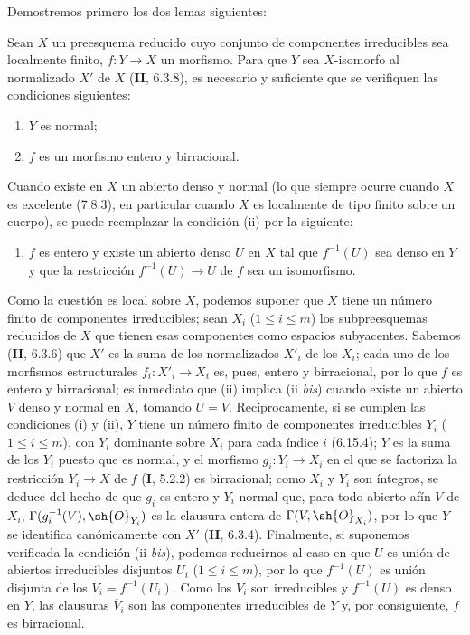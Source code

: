 Demostremos primero los dos lemas siguientes:

\begin{lemma}[17.15.14.1]
\label{IV.17.15.14.1}
Sean $X$ un preesquema reducido cuyo conjunto de componentes irreducibles sea localmente finito, $f:Y\to X$ un morfismo. Para que $Y$ sea $X$-isomorfo al normalizado $X'$ de $X$ \textup{(\textbf{II}, 6.3.8)}, es necesario y suficiente que se verifiquen las condiciones siguientes:
\begin{enumerate}
  \item[\textup{(i)}] $Y$ es normal;
  \item[\textup{(ii)}] $f$ es un morfismo entero y birracional.
\end{enumerate}
Cuando existe en $X$ un abierto denso y normal (lo que siempre ocurre cuando $X$ es excelente \textup{(7.8.3)}, en particular cuando $X$ es localmente de tipo finito sobre un cuerpo), se puede reemplazar la condición \textup{(ii)} por la siguiente:
\begin{enumerate}
  \item[\textup{(ii \emph{bis})}] $f$ es entero y existe un abierto denso $U$ en $X$ tal que $f^{-1}(U)$ sea denso en $Y$ y que la restricción $f^{-1}(U)\to U$ de $f$ sea un isomorfismo.
\end{enumerate}
\end{lemma}

Como la cuestión es local sobre $X$, podemos suponer que $X$ tiene un número finito de componentes irreducibles; sean $X_i$ ($1\leq i\leq m$) los subpreesquemas reducidos de $X$ que tienen esas componentes como espacios subyacentes. Sabemos (\textbf{II}, 6.3.6) que $X'$ es la suma de los normalizados $X'_i$ de los $X_i$; cada uno de los morfismos estructurales $f_i:X'_i\to X_i$ es, pues, entero y birracional, por lo que $f$ es entero y birracional; es inmediato que (ii) implica (ii \emph{bis}) cuando existe un abierto $V$ denso y normal en $X$, tomando $U=V$. Recíprocamente, si se cumplen las condiciones (i) y (ii), $Y$ tiene un número finito de componentes irreducibles $Y_i$ ($1\leq i\leq m$), con $Y_i$ dominante sobre $X_i$ para cada índice $i$ (6.15.4); $Y$ es la suma de los $Y_i$ puesto que es normal, y el morfismo $g_i:Y_i\to X_i$ en el que se factoriza la restricción $Y_i\to X$ de $f$ (\textbf I, 5.2.2) es birracional; como $X_i$ y $Y_i$ son íntegros, se deduce del hecho de que $g_i$ es entero y $Y_i$ normal que, para todo abierto afín $V$ de $X_i$, $\Gamma(g_i^{-1}(V),\sh{O}_{Y_i})$ es la clausura entera de $\Gamma(V,\sh{O}_{X_i})$, por lo que $Y$ se identifica canónicamente con $X'$ (\textbf{II}, 6.3.4). Finalmente, si suponemos verificada la condición (ii \emph{bis}), podemos reducirnos al caso en que $U$ es unión de abiertos irreducibles disjuntos $U_i$ ($1\leq i\leq m$), por lo que $f^{-1}(U)$ es unión disjunta de los $V_i=f^{-1}(U_i)$. Como los $V_i$ son irreducibles y $f^{-1}(U)$ es denso en $Y$, las clausuras $\overline V_i$ son las componentes irreducibles de $Y$ y, por consiguiente, $f$ es birracional.

